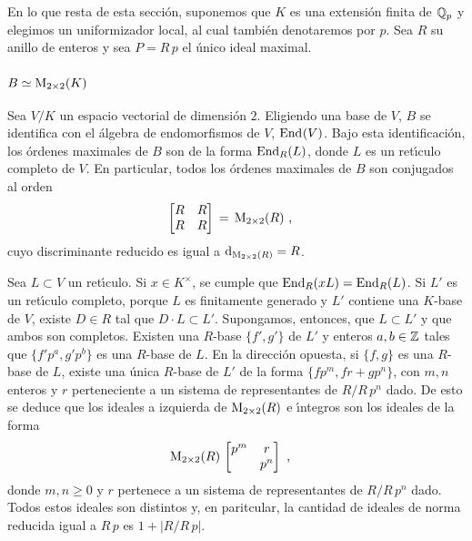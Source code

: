 %
En lo que resta de esta secci\'{o}n, suponemos que $K$ es una extensi\'{o}n
finita de $\bb{Q}_{p}$ y elegimos un uniformizador local, al cual tambi\'{e}n
denotaremos por $p$. Sea $R$ su anillo de enteros y sea $P=R\,p$ el \'{u}nico
ideal maximal. 

\subsubsection{$B\simeq\MM_{2\times 2}(K)$}
Sea $V/K$ un espacio vectorial de dimensi\'{o}n $2$. Eligiendo una base de $V$,
$B$ se identifica con el \'{a}lgebra de endomorfismos de $V$, $\Endo(V)$. Bajo
esta identificaci\'{o}n, los \'{o}rdenes maximales de $B$ son de la forma
$\Endo[R](L)$, donde $L$ es un ret\'{\i}culo completo de $V$. En particular,
todos los \'{o}rdenes maximales de $B$ son conjugados al orden
\begin{align*}
	\begin{bmatrix} R & R \\ R & R \end{bmatrix} & \,=\,
		\MM_{2\times 2}(R)
	\text{ ,}
\end{align*}
%
cuyo discriminante reducido es igual a $\drd{\MM_{2\times 2}(R)}=R$.

Sea $L\subset V$ un ret\'{\i}culo. Si $x\in K^{\times}$, se cumple que
$\Endo[R](xL)=\Endo[R](L)$. Si $L'$ es un ret\'{\i}culo completo, porque $L$
es finitamente generado y $L'$ contiene una $K$-base de $V$, existe $D\in R$
tal que $D\cdot L\subset L'$. Supongamos, entonces, que $L\subset L'$ y que
ambos son completos. Existen una $R$-base $\{f',g'\}$ de $L'$ y enteros
$a,b\in\bb{Z}$ tales que $\{f'p^{a},g'p^{b}\}$ es una $R$-base de $L$. En la
direcci\'{o}n opuesta, si $\{f,g\}$ es una $R$-base de $L$, existe una
\'{u}nica $R$-base de $L'$ de la forma $\{fp^{m},fr+gp^{n}\}$, con $m,n$
enteros y $r$ perteneciente a un sistema de representantes de $R/R\,p^n$ dado.
De esto se deduce que los ideales a izquierda de $\MM_{2\times 2}(R)$ e
\'{\i}ntegros son los ideales de la forma
\begin{align*}
	& \MM_{2\times 2}(R)\,\begin{bmatrix} p^m & r \\ & p^n \end{bmatrix}
	\text{ ,}
\end{align*}
%
donde $m,n\geq 0$ y $r$ pertenece a un sistema de representantes de $R/R\,p^n$
dado. Todos estos ideales son distintos y, en paritcular, la cantidad de
ideales de norma reducida igual a $R\,p$ es $1+|R/R\,p|$.

